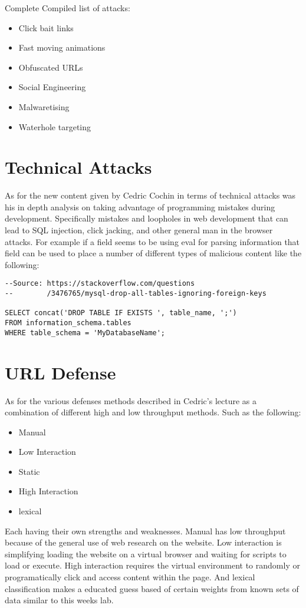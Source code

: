 \documentclass[letterpaper,12pt,titlepage,onecolumn]{IEEEtran}
\begin{document}
Complete Compiled list of attacks:
\begin{itemize}
    \item Click bait links
    \item Fast moving animations
    \item Obfuscated URLs
    \item Social Engineering
    \item Malwaretising
    \item Waterhole targeting 
\end{itemize}

\section{Technical Attacks}
As for the new content given by Cedric Cochin in terms of technical attacks was his in depth analysis on taking advantage of programming mistakes during development. Specifically mistakes and loopholes in web development that can lead to SQL injection, click jacking, and other general man in the browser attacks. For example if a field seems to be using eval for parsing information that field can be used to place a number of different types of malicious content like the following:

\begin{lstlisting}[language=mySQL]
--Source: https://stackoverflow.com/questions
--        /3476765/mysql-drop-all-tables-ignoring-foreign-keys

SELECT concat('DROP TABLE IF EXISTS ', table_name, ';')
FROM information_schema.tables
WHERE table_schema = 'MyDatabaseName';
\end{lstlisting}

\section{URL Defense}
As for the various defenses methods described in Cedric's lecture as a combination of different high and low throughput methods. 
Such as the following:
\begin{itemize}
    \item Manual
    \item Low Interaction
    \item Static
    \item High Interaction
    \item lexical 
\end{itemize}

Each having their own strengths and weaknesses. Manual has low throughput because of the general use of web research on the website. Low interaction is simplifying loading the website on a virtual browser and waiting for scripts to load or execute. High interaction requires the virtual environment to randomly or programatically click and access content within the page. And lexical classification makes a educated guess based of certain weights from known sets of data similar to this weeks lab.
\end{document}
